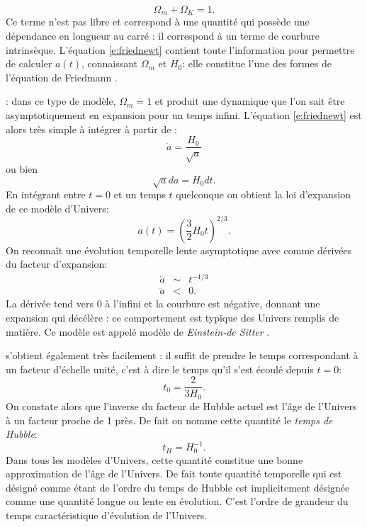 \begin{equation}
\Omega_m+\Omega_K=1.
\end{equation}
Ce terme n'est pas libre et correspond à une quantité qui possède une dépendance en $\mathrm{longueur}$ au carré : il correspond à un terme de courbure intrinsèque. L'équation \ref{e:friednewt} contient toute l'information pour permettre de calculer $a(t)$, connaissant $\Omega_m$ et $H_0$: elle constitue l'une des formes de l'équation de Friedmann .

: dans ce type de modèle, $\Omega_m=1$ et produit une dynamique que l'on sait être asymptotiquement en expansion pour un temps infini. L'équation \ref{e:friednewt} est alors très simple à intégrer à partir de :
\begin{equation}
\dot a=\frac{H_0}{\sqrt{a}}
\end{equation}
ou bien
\begin{equation}
\sqrt{a}da=H_0 dt.
\end{equation}
En intégrant entre $t=0$ et un temps $t$ quelconque on obtient la loi d'expansion de ce modèle d'Univers:
\begin{equation}
a(t)=\left(\frac{3}{2}H_0 t\right)^{2/3}.
\end{equation}
On reconnaît une évolution temporelle lente asymptotique avec comme dérivées du facteur d'expansion:
\begin{eqnarray}
\dot a &\sim& t^{-1/3}\\
\ddot a &<&0.
\end{eqnarray}
La dérivée tend vers 0 à l'infini et la courbure est négative, donnant une expansion qui décélère : ce comportement est typique des Univers remplis de matière. Ce modèle est appelé modèle de \textit{Einstein-de Sitter} .

 s'obtient également très facilement : il suffit de prendre le temps correspondant à un facteur d'échelle unité, c'est à dire le temps qu'il s'est écoulé depuis $t=0$:
\begin{equation}
t_0=\frac{2}{3H_0}.
\end{equation}
On constate alors que l'inverse du facteur de Hubble actuel est l'âge de l'Univers à un facteur proche de 1 près. De fait on nomme cette quantité le \textit{temps de Hubble}:
\begin{equation}
t_H=H_0^{-1}.
\end{equation} 
Dans tous les modèles d'Univers, cette quantité constitue une bonne approximation de l'âge de l'Univers. De fait toute quantité temporelle qui est désigné comme étant de l'ordre du temps de Hubble  est implicitement désignée comme une quantité longue ou lente en évolution. C'est l'ordre de grandeur du temps caractéristique d'évolution de l'Univers.

